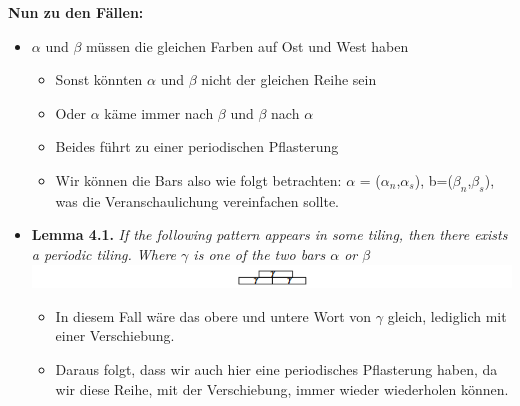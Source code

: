 \textbf{Nun zu den Fällen:}
\begin{itemize}
    \item $\alpha$ und $\beta$ müssen die gleichen Farben auf Ost und West haben
    \begin{itemize}
        \item Sonst könnten $\alpha$ und $\beta$ nicht der gleichen Reihe sein
        \item Oder $\alpha$ käme immer nach $\beta$ und $\beta$ nach $\alpha$
        \item Beides führt zu einer periodischen Pflasterung
        \item Wir können die Bars also wie folgt betrachten: $\alpha$ = ($\alpha_n$,$\alpha_s$), b=($\beta_n$,$\beta_s$), was die Veranschaulichung vereinfachen sollte.
    \end{itemize}
    
    \item \textbf{Lemma 4.1.} {\itshape If the following pattern appears in some tiling, then there exists a periodic tiling. Where $\gamma$ is one of the two bars $\alpha$ or $\beta$}
    \\ \includegraphics[width=\textwidth]{src/pics/1.png}
    \begin{itemize}
        \item In diesem Fall wäre das obere und untere Wort von $\gamma$ gleich, lediglich mit einer Verschiebung. 
        \item Daraus folgt, dass wir auch hier eine periodisches Pflasterung haben, da wir diese Reihe, mit der Verschiebung, immer wieder wiederholen können.
    \end{itemize}
    

\end{itemize}
